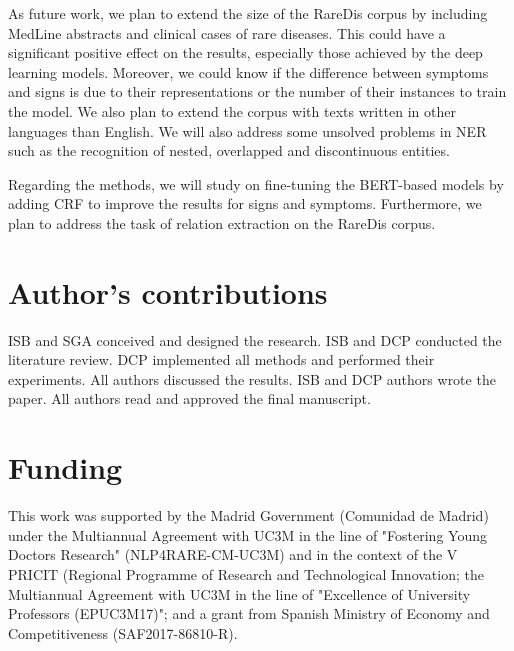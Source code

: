 \documentclass[preprint,12pt]{elsarticle}
\begin{document}
As future work, we plan to extend the size of the RareDis corpus by including MedLine abstracts and clinical cases of rare diseases. This could have a significant positive effect on the results, especially those achieved by the deep learning models. Moreover, we could know if the difference between symptoms and signs is due to their representations or the number of their instances to train the model. We also plan to extend the corpus with texts written in other languages than English. 
We will also address some unsolved problems in NER such as the recognition of nested, overlapped and discontinuous entities. 


Regarding the methods, we will study on fine-tuning the BERT-based models by adding CRF to improve the results for signs and symptoms. Furthermore, we plan to address the task of relation extraction on the RareDis corpus. 


\section*{Author's contributions}

ISB and SGA conceived and designed the research.
ISB and DCP conducted the literature review.
DCP implemented all methods and performed their experiments. 
All authors discussed the results.
ISB and DCP authors wrote the paper. 
All authors read and approved the final manuscript. 


\section*{Funding}
This work was supported by the Madrid Government (Comunidad de Madrid) under the Multiannual Agreement with UC3M in the line of "Fostering Young Doctors Research" (NLP4RARE-CM-UC3M) and in the context of the V PRICIT (Regional Programme of Research and Technological Innovation; the Multiannual Agreement with UC3M in the line of "Excellence of University Professors (EPUC3M17)"; and a grant from Spanish Ministry of Economy and Competitiveness (SAF2017-86810-R). 







\newpage
\appendix
\end{document}
